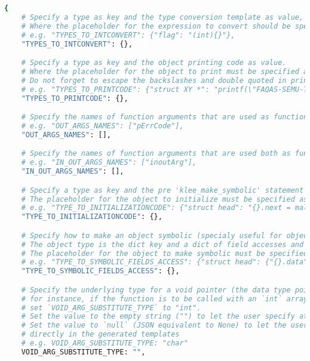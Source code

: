 \begin{lstlisting}[language=bash,label=listing:json:conf,caption=generate\_template\_config.json file.]
{
    # Specify a type as key and the type conversion template as value, 
    # Where the placeholder for the expression to convert should be specified as the string '{}'
    # e.g. "TYPES_TO_INTCONVERT": {"flag": "(int){}"},
    "TYPES_TO_INTCONVERT": {},

    # Specify a type as key and the object printing code as value.
    # Where the placeholder for the object to print must be specified as the string '{}'
    # Do not forget to escape the backslashes and double quoted in printf fmt.
    # e.g. "TYPES_TO_PRINTCODE": {"struct XY *": "printf(\"FAQAS-SEMU-TEST_OUTPUT: X=%d, Y=%s\\n\", {}->x, {}->y)"}
    "TYPES_TO_PRINTCODE": {},

    # Specify the names of function arguments that are used as function output (passed by reference for output only)
    # e.g. "OUT_ARGS_NAMES": ["pErrCode"],
    "OUT_ARGS_NAMES": [],

    # Specify the names of function arguments that are used both as function input and output (passed by reference)
    # e.g. "IN_OUT_ARGS_NAMES": ["inoutArg"],
    "IN_OUT_ARGS_NAMES": [],

    # Specify a type as key and the pre 'klee_make_symbolic' statement initialization code as value,
    # The placeholder for the object to initialize must be specified as the string '{}'
    # e.g. "TYPE_TO_INITIALIZATIONCODE": {"struct head": "{}.next = malloc(sizeof(struct head));\n{}.next->next = NULL;"}
    "TYPE_TO_INITIALIZATIONCODE": {},

    # Specify how to make an object symbolic (specialy useful for objects that are initialized, like pointers).
    # The object type is the dict key and a dict of field accesses and their type is the dict value.
    # The placeholder for the object to make symbolic must be specified as the string '{}'
    # e.g. "TYPE_TO_SYMBOLIC_FIELDS_ACCESS": {"struct head": {"{}.data": "char [3]", "{}.next->data": "char [3]"}}
    "TYPE_TO_SYMBOLIC_FIELDS_ACCESS": {},

    # Specify the underlying type for a void pointer (the data type pointed by the void pointer).
    # for instance, if the function is to be called with an `int` array for a void pointer parameter,
    # set `VOID_ARG_SUBSTITUTE_TYPE` to "int".
    # Set the value to the empty string ("") to let the user specify at runtime on case by case
    # Set the value to `null` (JSON equivalent to None) to let the user change the types `void` 
    # directly in the generated templates
    # e.g. VOID_ARG_SUBSTITUTE_TYPE: "char"
    VOID_ARG_SUBSTITUTE_TYPE: "",


\end{lstlisting}
